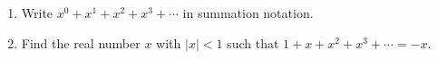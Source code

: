 \begin{enumerate}
\item[(a)] Write $x^0+x^1+x^2+x^3+\cdots$ in summation notation.
\item[(b)] Find the real number $x$ with $|x|<1$ such that $1+x+x^2+x^3+\cdots=-x$.
\end{enumerate}
